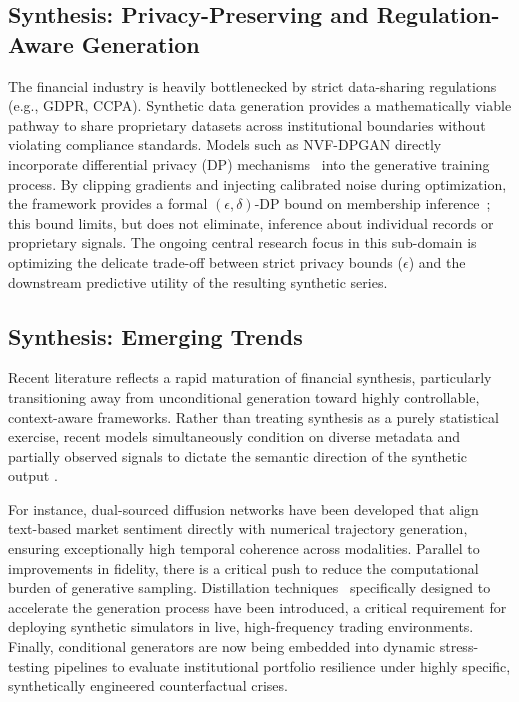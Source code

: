 \subsection{Synthesis: Privacy-Preserving and Regulation-Aware Generation}

The financial industry is heavily bottlenecked by strict data-sharing regulations (e.g., GDPR, CCPA). Synthetic data generation provides a mathematically viable pathway to share proprietary datasets across institutional boundaries without violating compliance standards. Models such as NVF-DPGAN \citep{NVF-DPGAN} directly incorporate differential privacy (DP) mechanisms~\citep{dwork2006differential,dwork2014algorithmic} into the generative training process. By clipping gradients and injecting calibrated noise during optimization, the framework provides a formal $(\epsilon,\delta)$-DP bound on membership inference~\citep{shokri2017membership}; this bound limits, but does not eliminate, inference about individual records or proprietary signals. The ongoing central research focus in this sub-domain is optimizing the delicate trade-off between strict privacy bounds ($\epsilon$) and the downstream predictive utility of the resulting synthetic series.

\subsection{Synthesis: Emerging Trends}

Recent literature reflects a rapid maturation of financial synthesis, particularly transitioning away from unconditional generation toward highly controllable, context-aware frameworks. Rather than treating synthesis as a purely statistical exercise, recent models simultaneously condition on diverse metadata and partially observed signals to dictate the semantic direction of the synthetic output \citep{wang2024mtsisurvey}.

For instance, dual-sourced diffusion networks have been developed that align text-based market sentiment directly with numerical trajectory generation, ensuring exceptionally high temporal coherence across modalities. Parallel to improvements in fidelity, there is a critical push to reduce the computational burden of generative sampling. Distillation techniques~\citep{hinton2015distilling} specifically designed to accelerate the generation process have been introduced, a critical requirement for deploying synthetic simulators in live, high-frequency trading environments. Finally, conditional generators are now being embedded into dynamic stress-testing pipelines to evaluate institutional portfolio resilience under highly specific, synthetically engineered counterfactual crises.


